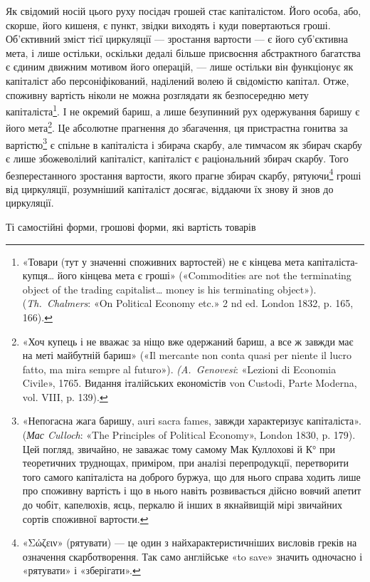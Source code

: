 Як свідомий носій цього руху посідач грошей стає капіталістом.
Його особа, або, скорше, його кишеня, є пункт, звідки виходять
і куди повертаються гроші. Об’єктивний зміст тієї циркуляції
— зростання вартости — є його суб’єктивна мета, і лише
остільки, оскільки дедалі більше присвоєння абстрактного багатства
є єдиним движним мотивом його операцій, — лише остільки
він функціонує як капіталіст або персоніфікований, наділений
волею й свідомістю капітал. Отже, споживну вартість ніколи не
можна розглядати як безпосередню мету капіталіста\footnote{
«Товари (тут у значенні споживних вартостей) не є кінцева мета
капіталіста-купця\dots{} його кінцева мета є гроші» («Commodities are
not the terminating object of the trading capitalist\dots{} money is his terminating
object»). (\emph{Th.~Chalmers}: «On Political Economy etc.» 2 nd ed. London
1832, p. 165, 166).
}. І не окремий
бариш, а лише безупинний рух одержування баришу є його
мета\footnote{
«Хоч купець і не вважає за ніщо вже одержаний бариш, а все ж
завжди має на меті майбутній бариш» («Il mercante non conta quasi per
niente il lucro fatto, ma mira sempre al futuro»). \emph{(A.~Genovesi}: «Lezioni
di Economia Civile», 1765. Видання італійських економістів von Custodi,
Parte Moderna, vol. VIII, p. 139).
}. Це абсолютне прагнення до збагачення, ця пристрастна
гонитва за вартістю\footnote{
«Непогасна жага баришу, auri sacra fames, завжди характеризує
капіталіста». (\emph{Мас Culloch}: «The Principles of Political Economy»,
London 1830, p. 179). Цей погляд, звичайно, не заважає тому самому
Мак Куллохові й К° при теоретичних труднощах, приміром, при аналізі
перепродукції, перетворити того самого капіталіста на доброго буржуа,
що для нього справа ходить лише про споживну вартість і що в нього
навіть розвивається дійсно вовчий апетит до чобіт, капелюхів, яєць,
перкалю й інших в якнайвищій мірі звичайних сортів споживної вартости.
} є спільне в капіталіста і збирача скарбу,
але тимчасом як збирач скарбу є лише збожеволілий капіталіст,
капіталіст є раціональний збирач скарбу. Того безперестанного
зростання вартости, якого прагне збирач скарбу, рятуючи\footnote{
«\textgreek{Σώζειν}» (рятувати) — це один з найхарактеристичніших висловів
греків на означення скарботворення. Так само англійське «to save» значить
одночасно і «рятувати» і «зберігати».
} гроші від циркуляції, розумніший капіталіст досягає, віддаючи їх знову
й знов до циркуляції.

Ті самостійні форми, грошові форми, які вартість товарів
\parbreak{}  %
